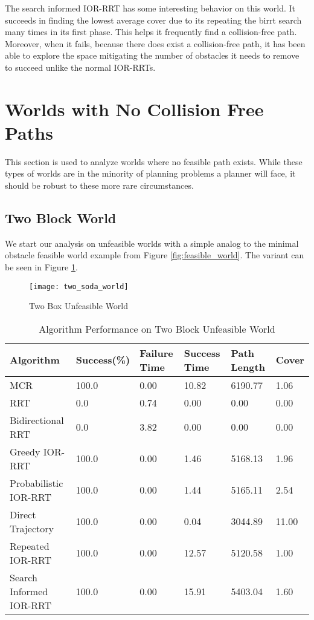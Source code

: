 The search informed IOR-RRT has some interesting behavior on this world. It succeeds in finding the lowest average cover due to its repeating the birrt search many times in its first phase. This helps it frequently find a collision-free path. Moreover, when it fails, because there does exist a collision-free path, it has been able to explore the space mitigating the number of obstacles it needs to remove to succeed unlike the normal IOR-RRTs.


\section{Worlds with No Collision Free Paths}\label{results:unfeasible}
This section is used to analyze worlds where no feasible path exists. While these types of worlds are in the minority of planning problems a planner will face, it should be robust to these more rare circumstances. 

\subsection{Two Block World}
We start our analysis on unfeasible worlds with a simple analog to the minimal obstacle feasible world example from Figure \ref{fig:feasible_world}. The variant can be seen in Figure \ref{fig:two_soda_world}.

\begin{figure}[h!]
    \centering
    \texttt{[image: two\_soda\_world]}
    \caption{Two Box Unfeasible World}
    \label{fig:two_soda_world}
\end{figure}

\begin{table}[h!]
\centering
\begin{tabular}{@{}llllll@{}}
\toprule
Algorithm & Success(\%) & Failure Time & Success Time & Path Length & Cover \\
\midrule
MCR & 100.0 & 0.00 & 10.82 & 6190.77 & 1.06 \\
RRT & 0.0 & 0.74 & 0.00 & 0.00 & 0.00 \\
Bidirectional RRT & 0.0 & 3.82 & 0.00 & 0.00 & 0.00 \\
Greedy IOR-RRT & 100.0 & 0.00 & 1.46 & 5168.13 & 1.96 \\
Probabilistic IOR-RRT & 100.0 & 0.00 & 1.44 & 5165.11 & 2.54 \\
Direct Trajectory & 100.0 & 0.00 & 0.04 & 3044.89 & 11.00 \\
Repeated IOR-RRT & 100.0 & 0.00 & 12.57 & 5120.58 & 1.00 \\
Search Informed IOR-RRT & 100.0 & 0.00 & 15.91 & 5403.04 & 1.60 \\
\bottomrule
\end{tabular}
\caption{Algorithm Performance on Two Block Unfeasible World}
\label{tab:two_soda_world}
\end{table}

